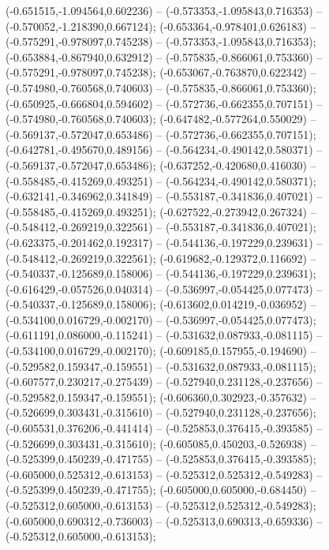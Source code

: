  (-0.651515,-1.094564,0.602236) -- (-0.573353,-1.095843,0.716353) -- (-0.570052,-1.218390,0.667124);
 (-0.653364,-0.978401,0.626183) -- (-0.575291,-0.978097,0.745238) -- (-0.573353,-1.095843,0.716353);
 (-0.653884,-0.867940,0.632912) -- (-0.575835,-0.866061,0.753360) -- (-0.575291,-0.978097,0.745238);
 (-0.653067,-0.763870,0.622342) -- (-0.574980,-0.760568,0.740603) -- (-0.575835,-0.866061,0.753360);
 (-0.650925,-0.666804,0.594602) -- (-0.572736,-0.662355,0.707151) -- (-0.574980,-0.760568,0.740603);
 (-0.647482,-0.577264,0.550029) -- (-0.569137,-0.572047,0.653486) -- (-0.572736,-0.662355,0.707151);
 (-0.642781,-0.495670,0.489156) -- (-0.564234,-0.490142,0.580371) -- (-0.569137,-0.572047,0.653486);
 (-0.637252,-0.420680,0.416030) -- (-0.558485,-0.415269,0.493251) -- (-0.564234,-0.490142,0.580371);
 (-0.632141,-0.346962,0.341849) -- (-0.553187,-0.341836,0.407021) -- (-0.558485,-0.415269,0.493251);
 (-0.627522,-0.273942,0.267324) -- (-0.548412,-0.269219,0.322561) -- (-0.553187,-0.341836,0.407021);
 (-0.623375,-0.201462,0.192317) -- (-0.544136,-0.197229,0.239631) -- (-0.548412,-0.269219,0.322561);
 (-0.619682,-0.129372,0.116692) -- (-0.540337,-0.125689,0.158006) -- (-0.544136,-0.197229,0.239631);
 (-0.616429,-0.057526,0.040314) -- (-0.536997,-0.054425,0.077473) -- (-0.540337,-0.125689,0.158006);
 (-0.613602,0.014219,-0.036952) -- (-0.534100,0.016729,-0.002170) -- (-0.536997,-0.054425,0.077473);
 (-0.611191,0.086000,-0.115241) -- (-0.531632,0.087933,-0.081115) -- (-0.534100,0.016729,-0.002170);
 (-0.609185,0.157955,-0.194690) -- (-0.529582,0.159347,-0.159551) -- (-0.531632,0.087933,-0.081115);
 (-0.607577,0.230217,-0.275439) -- (-0.527940,0.231128,-0.237656) -- (-0.529582,0.159347,-0.159551);
 (-0.606360,0.302923,-0.357632) -- (-0.526699,0.303431,-0.315610) -- (-0.527940,0.231128,-0.237656);
 (-0.605531,0.376206,-0.441414) -- (-0.525853,0.376415,-0.393585) -- (-0.526699,0.303431,-0.315610);
 (-0.605085,0.450203,-0.526938) -- (-0.525399,0.450239,-0.471755) -- (-0.525853,0.376415,-0.393585);
 (-0.605000,0.525312,-0.613153) -- (-0.525312,0.525312,-0.549283) -- (-0.525399,0.450239,-0.471755);
 (-0.605000,0.605000,-0.684450) -- (-0.525312,0.605000,-0.613153) -- (-0.525312,0.525312,-0.549283);
 (-0.605000,0.690312,-0.736003) -- (-0.525313,0.690313,-0.659336) -- (-0.525312,0.605000,-0.613153);

